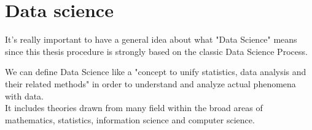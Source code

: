 
\section{Data science}
\vspace{-5mm}
It's really important to have a general idea about what "Data Science" means since this thesis procedure is strongly based on the classic Data Science Process.

We can define Data Science like a "concept to unify statistics, data analysis and their related methods" in order to understand and analyze actual phenomena with data.\cite{wiki:DataScience}\\
It includes theories drawn from many field within the broad areas of mathematics, statistics, information science and computer science.

